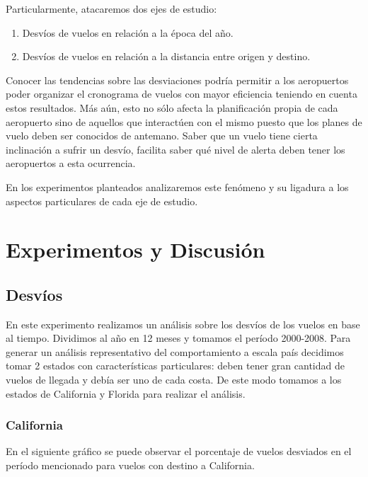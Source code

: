 \documentclass{endm}
\begin{document}
Particularmente, atacaremos dos ejes de estudio:

\begin{enumerate}
\item Desv\'ios de vuelos en relaci\'on a la \'epoca del a\~no.
\item Desv\'ios de vuelos en relaci\'on a la distancia entre origen y destino.
\end{enumerate}

Conocer las tendencias sobre las desviaciones podr\'ia permitir a los aeropuertos poder organizar el cronograma de vuelos con mayor eficiencia teniendo en cuenta estos resultados. M\'as a\'un, esto no s\'olo afecta la planificaci\'on propia de cada aeropuerto sino de aquellos que interact\'uen con el mismo puesto que los planes de vuelo deben ser conocidos de antemano. Saber que un vuelo tiene cierta inclinaci\'on a sufrir un desv\'io, facilita saber qu\'e nivel de alerta deben tener los aeropuertos a esta ocurrencia.

En los experimentos planteados analizaremos este fen\'omeno y su ligadura a los aspectos particulares de cada eje de estudio.
\newpage

\section{Experimentos y Discusi\'on}

\subsection{Desv\'ios}

En este experimento realizamos un an\'alisis sobre los desv\'ios de los vuelos en base al tiempo. Dividimos al a\~no en 12 meses y tomamos el per\'iodo 2000-2008. Para generar un an\'alisis representativo del comportamiento a escala pa\'is decidimos tomar 2 estados con caracter\'isticas particulares: deben tener gran cantidad de vuelos de llegada y deb\'ia ser uno de cada costa. De este modo tomamos a los estados de California y Florida para realizar el an\'alisis.

\subsubsection{California}

En el siguiente gr\'afico se puede observar el porcentaje de vuelos desviados en el per\'iodo mencionado para vuelos con destino a California.
\end{document}
